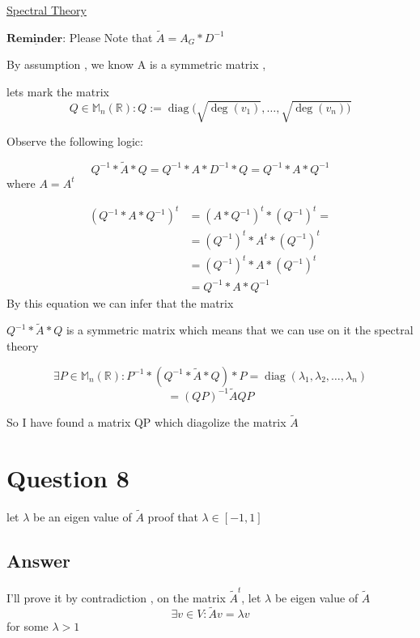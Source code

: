 \documentclass[9pt,twocolumn]{article}
\DeclareMathOperator{\diag}{diag}
\begin{document}
\href{https://en.wikipedia.org/wiki/Spectral\_theory}{Spectral Theory}

\begin{math}
\underline{\textbf{Reminder:}}
\end{math}
Please Note that \(\tilde{A}=A_G*D^{-1}\)

By assumption , we know A is a symmetric matrix ,

lets mark the matrix
\[ Q\in \mathbb{M}_n(\mathbb{R}) : Q := \diag(\sqrt{ \deg(v_1) },\dots , \sqrt{ \deg(v_n)) } \]

Observe the following logic:

\[
Q^{-1}*\tilde{A}*Q=Q^{-1}*A*D^{-1}*Q=Q^{-1}*A*Q^{-1}
\]
where \(A=A^{t}\)

\begin{align*}
(Q^{-1}*A*Q^{-1})^{t}&=(A*Q^{-1})^t*(Q^{-1})^t= \\
                    &=(Q^{-1})^t*A^t*(Q^{-1})^t \\
                    &=(Q^{-1})^t*A*(Q^{-1})^t \\
                    &=Q^{-1}*A*Q^{-1}
\end{align*}
By this equation we can infer that the matrix

\(Q^{-1}*\tilde{A}*Q\) is
a symmetric matrix which means that we can use on it the spectral theory

\[
\exists P\in \mathbb{M}_n(\mathbb{R}) : P^{-1}*(Q^{-1}*\tilde{A}*Q)*P = \diag(\lambda _1 , \lambda _2 , \dots , \lambda _n)
\]
\[
=(QP)^{-1}\tilde{A}QP
\]

So I have found a matrix QP which diagolize the matrix \(\tilde{A}\)






\section*{Question 8}
\label{sec:orgebd9fb3}

let \(\lambda\) be an eigen value of \(\tilde{A}\) proof that
\(\lambda\in [-1,1]\)

\subsection*{Answer}
\label{sec:org4115005}
I'll prove it by contradiction , on the matrix \(\tilde{A}^t\), let \(\lambda\) be eigen value of \(\tilde{A}\)
\[\exists v\in V : \tilde{A}v=\lambda v\]
for some \(\lambda > 1\)
\end{document}
